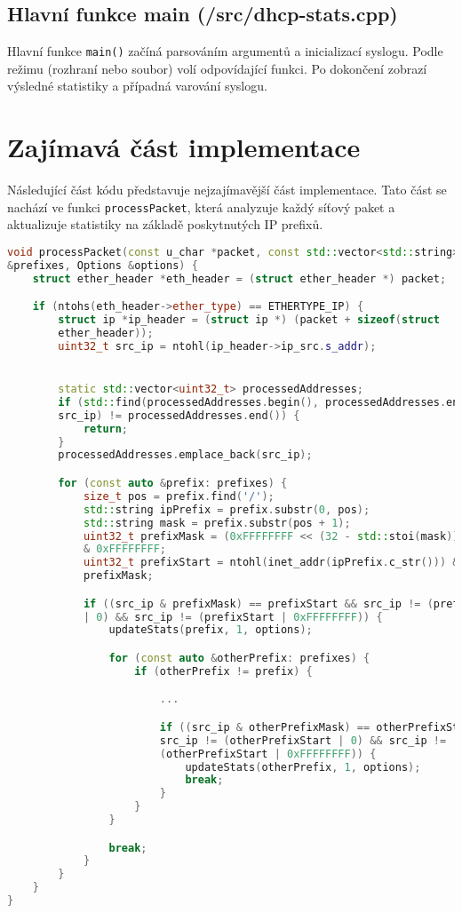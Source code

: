 \documentclass[a4paper, 11pt]{article}
\begin{document}
    \subsection{Hlavní funkce main (/src/dhcp-stats.cpp)}

    Hlavní funkce \texttt{main()} začíná parsováním argumentů a inicializací syslogu. Podle režimu (rozhraní nebo soubor) volí odpovídající funkci. Po dokončení zobrazí výsledné statistiky a případná varování syslogu.

    \section{Zajímavá část implementace}

    Následující část kódu představuje nejzajímavější část implementace. Tato část se nachází ve funkci \texttt{processPacket}, která analyzuje každý síťový paket a aktualizuje statistiky na základě poskytnutých IP prefixů.

    \begin{lstlisting}[language=C++, label={lst:processPacket}]
void processPacket(const u_char *packet, const std::vector<std::string>
&prefixes, Options &options) {
    struct ether_header *eth_header = (struct ether_header *) packet;

    if (ntohs(eth_header->ether_type) == ETHERTYPE_IP) {
        struct ip *ip_header = (struct ip *) (packet + sizeof(struct
        ether_header));
        uint32_t src_ip = ntohl(ip_header->ip_src.s_addr);


        static std::vector<uint32_t> processedAddresses;
        if (std::find(processedAddresses.begin(), processedAddresses.end(),
        src_ip) != processedAddresses.end()) {
            return;
        }
        processedAddresses.emplace_back(src_ip);

        for (const auto &prefix: prefixes) {
            size_t pos = prefix.find('/');
            std::string ipPrefix = prefix.substr(0, pos);
            std::string mask = prefix.substr(pos + 1);
            uint32_t prefixMask = (0xFFFFFFFF << (32 - std::stoi(mask)))
            & 0xFFFFFFFF;
            uint32_t prefixStart = ntohl(inet_addr(ipPrefix.c_str())) &
            prefixMask;

            if ((src_ip & prefixMask) == prefixStart && src_ip != (prefixStart
            | 0) && src_ip != (prefixStart | 0xFFFFFFFF)) {
                updateStats(prefix, 1, options);

                for (const auto &otherPrefix: prefixes) {
                    if (otherPrefix != prefix) {

                        ...

                        if ((src_ip & otherPrefixMask) == otherPrefixStart &&
                        src_ip != (otherPrefixStart | 0) && src_ip !=
                        (otherPrefixStart | 0xFFFFFFFF)) {
                            updateStats(otherPrefix, 1, options);
                            break;
                        }
                    }
                }

                break;
            }
        }
    }
}

    \end{lstlisting}
\end{document}
